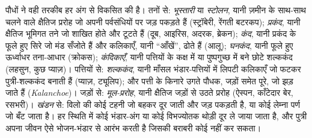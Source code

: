 \begin{proposition}[कायिक गुणन के अंग]\label{prop:b2:asexual-reproduction:organs}
पौधों ने वही तरकीब हर अंग से विकसित की है। तनों से:
\emph{भूस्तारी} या \emph{स्टोलन}, यानी ज़मीन के साथ-साथ चलने वाले क्षैतिज
प्ररोह जो अपनी पर्वसंधियों पर जड़ पकड़ते हैं (स्ट्रॉबेरी, रेंगती
बटरकप); \emph{प्रकंद}, यानी क्षैतिज भूमिगत तने जो शाखित होते और टूटते
हैं (दूब, आइरिस, अदरक, ब्रेकन); \emph{कंद}, यानी प्रकंद के फूले हुए
सिरे जो मंड सँजोते हैं और कलिकाएँ, यानी ``आँखें'', ढोते हैं
(आलू); \emph{घनकंद}, यानी फूले हुए ऊर्ध्वाधर तना-आधार (क्रोकस);
\emph{कंदिकाएँ}, यानी पत्तियों के कक्ष में या
पुष्पगुच्छ में बने छोटे शल्ककंद (लहसुन, कुछ प्याज़)। पत्तियों से:
\emph{शल्ककंद}, यानी माँसल भंडार-पत्तियों में लिपटी कलिकाएँ जो फटकर
पुत्री-शल्ककंद बनाती हैं (प्याज़, ट्यूलिप); और पत्ती के किनारे उगते
पौधक, जड़ों समेत पूरे, जो झड़ जाते हैं (\emph{Kalanchoe})। जड़ों से:
\emph{मूल-प्ररोह}, यानी क्षैतिज जड़ों से उठते प्ररोह (ऐस्पन, काँटेदार
बेर, रसभरी)। \emph{खंडन} से: विलो की कोई टहनी जो बहकर दूर जाती और जड़
पकड़ती है, या कोई लेम्ना पर्ण जो बँट जाता है। हर स्थिति में कोई
भंडार-अंग या कोई विभज्योतक थोड़ी दूर ले जाया जाता है, और पुत्री अपना
जीवन ऐसे भोजन-भंडार से आरंभ करती है जिसकी बराबरी कोई  नहीं कर सकता।
\end{proposition}

